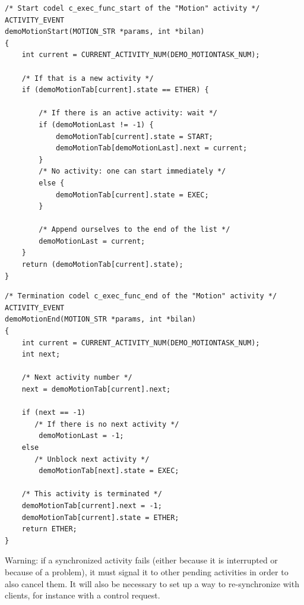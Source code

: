 \begin{center}\begin{cartouche}\small\begin{verbatim}
/* Start codel c_exec_func_start of the "Motion" activity */
ACTIVITY_EVENT
demoMotionStart(MOTION_STR *params, int *bilan)
{
    int current = CURRENT_ACTIVITY_NUM(DEMO_MOTIONTASK_NUM);

    /* If that is a new activity */
    if (demoMotionTab[current].state == ETHER) {

        /* If there is an active activity: wait */
        if (demoMotionLast != -1) {
            demoMotionTab[current].state = START;
            demoMotionTab[demoMotionLast].next = current;
        }
        /* No activity: one can start immediately */
        else {
            demoMotionTab[current].state = EXEC;
        }

        /* Append ourselves to the end of the list */
        demoMotionLast = current;
    }
    return (demoMotionTab[current].state);
}
\end{verbatim}\end{cartouche}\end{center}

\begin{center}\begin{cartouche}\small\begin{verbatim}
/* Termination codel c_exec_func_end of the "Motion" activity */
ACTIVITY_EVENT
demoMotionEnd(MOTION_STR *params, int *bilan)
{
    int current = CURRENT_ACTIVITY_NUM(DEMO_MOTIONTASK_NUM);
    int next;

    /* Next activity number */
    next = demoMotionTab[current].next;

    if (next == -1) 
       /* If there is no next activity */
        demoMotionLast = -1;
    else
       /* Unblock next activity */
        demoMotionTab[next].state = EXEC;

    /* This activity is terminated */
    demoMotionTab[current].next = -1;
    demoMotionTab[current].state = ETHER;
    return ETHER;
}
\end{verbatim}\end{cartouche}\end{center}

Warning: if   a   synchronized activity   fails (either  because   it  is
interrupted or because of a problem), it must signal  it to other pending
activities in order to also cancel them. It will also be necessary to set
up  a way to  re-synchronize  with clients,  for  instance with a control
request.


